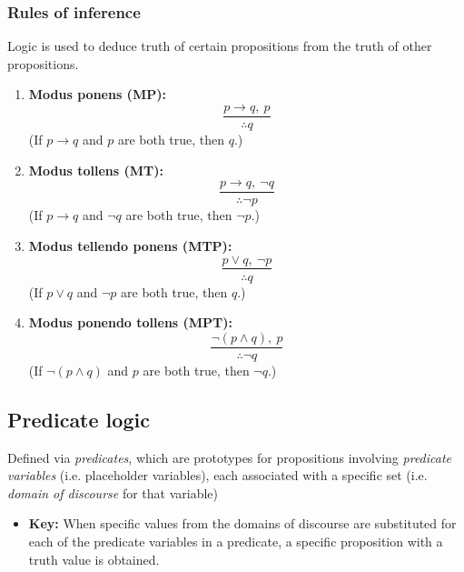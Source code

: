     \subsubsection{Rules of inference}
    Logic is used to deduce truth of certain propositions from the truth of other propositions.
    \begin{definition}
        \begin{enumerate}
            \item \textbf{Modus ponens (MP):}
                \[
                \frac{p \rightarrow q, \ p}{\therefore q}
                \]
                (If \(p \rightarrow q\) and \(p\) are both true, then \(q\).)
    
            \item \textbf{Modus tollens (MT):}
                \[
                \frac{p \rightarrow q, \ \neg q}{\therefore \neg p}
                \]
                (If \(p \rightarrow q\) and \(\neg q\) are both true, then \(\neg p\).)
            \item \textbf{Modus tellendo ponens (MTP):}
                \[
                \frac{p \lor q, \ \neg p}{\therefore q}
                \]
                (If \(p \lor q\) and \(\neg p\) are both true, then \(q\).)
            \item \textbf{Modus ponendo tollens (MPT):}
                \[
                \frac{\neg(p \land q), \ p}{\therefore \neg q}
                \]
                (If \(\neg(p \land q)\) and \(p\) are both true, then \(\neg q\).)
        \end{enumerate}
    \end{definition}

\subsection{Predicate logic}
\begin{definition}
    Defined via \emph{predicates}, which are prototypes for propositions involving \emph{predicate variables} (i.e. placeholder variables), each associated with a specific set (i.e. \emph{domain of discourse} for that variable)
    \begin{itemize}
        \item \textbf{Key:} When specific values from the domains of discourse are substituted for each of the predicate variables in a predicate, a specific proposition with a truth value is obtained.
    \end{itemize}
\end{definition}
    
